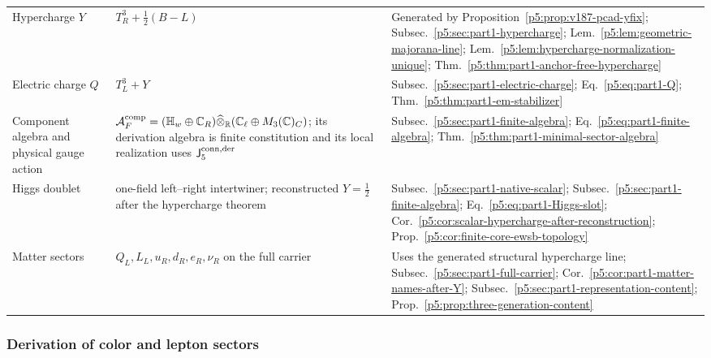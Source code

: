 \documentclass[12pt,a4paper]{article}
\begin{document}
\begin{table}[H]
\begin{tabularx}{\textwidth}{>{\raggedright\arraybackslash}p{}
                                >{\raggedright\arraybackslash}X
                                >{\raggedright\arraybackslash}p{}}
Hypercharge \(Y\) &
\(
T_R^3+\frac12(B-L)
\)
&
Generated by Proposition~\ref{p5:prop:v187-pcad-yfix};
Subsec.~\ref{p5:sec:part1-hypercharge};
Lem.~\ref{p5:lem:geometric-majorana-line};
Lem.~\ref{p5:lem:hypercharge-normalization-unique};
Thm.~\ref{p5:thm:part1-anchor-free-hypercharge} \\

Electric charge \(Q\) &
\(
T_L^3+Y
\)
&
Subsec.~\ref{p5:sec:part1-electric-charge};
Eq.~\eqref{p5:eq:part1-Q};
Thm.~\ref{p5:thm:part1-em-stabilizer} \\

Component algebra and physical gauge action &
\(\mathcal A_F^{\rm comp}
=(\mathbb H_w\oplus\mathbb C_R)\widehat\otimes_{\mathbb R}
(\mathbb C_\ell\oplus M_3(\mathbb C)_C)\); its derivation algebra is finite
constitution and its local realization uses \(\mathsf J_5^{\rm conn,der}\) &
Subsec.~\ref{p5:sec:part1-finite-algebra};
Eq.~\eqref{p5:eq:part1-finite-algebra};
Thm.~\ref{p5:thm:part1-minimal-sector-algebra} \\

Higgs doublet &
one-field left--right intertwiner; reconstructed \(Y=\frac12\) after the
hypercharge theorem &
Subsec.~\ref{p5:sec:part1-native-scalar};
Subsec.~\ref{p5:sec:part1-finite-algebra};
Eq.~\eqref{p5:eq:part1-Higgs-slot};
Cor.~\ref{p5:cor:scalar-hypercharge-after-reconstruction};
Prop.~\ref{p5:cor:finite-core-ewsb-topology} \\

Matter sectors &
\(Q_L,L_L,u_R,d_R,e_R,\nu_R\) on the full carrier &
Uses the generated structural hypercharge line;
Subsec.~\ref{p5:sec:part1-full-carrier};
Cor.~\ref{p5:cor:part1-matter-names-after-Y};
Subsec.~\ref{p5:sec:part1-representation-content};
Prop.~\ref{p5:prop:three-generation-content} \\
\bottomrule
\end{tabularx}

\end{table}

\subsubsection{Derivation of color and lepton sectors}
\label{p5:sec:part1-color-lepton}
\end{document}
